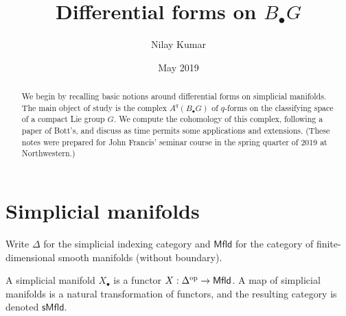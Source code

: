 \documentclass{amsart}
\title{Differential forms on $B_\bullet G$}
\author{Nilay Kumar}
\date{May 2019}
\begin{document}
\begin{abstract}
    We begin by recalling basic notions around differential forms on simplicial
    manifolds. The main object of study is the complex $A^q(B_\bullet G)$ of
    $q$-forms on the classifying space of a compact Lie group $G$. We compute
    the cohomology of this complex, following a paper of Bott's, and discuss as
    time permits some applications and extensions.
    (These notes were prepared for John Francis' seminar course in the spring 
    quarter of 2019 at Northwestern.)
\end{abstract}

\maketitle

\section{Simplicial manifolds}

Write $\Delta$ for the simplicial indexing category and $\mathsf{Mfld}$ for the 
category of finite-dimensional smooth manifolds (without boundary).

\begin{definition}
    A simplicial manifold $X_\bullet$ is a functor $X: \Delta^{\text{op}}\to 
    \mathsf{Mfld}$. A map of simplicial manifolds is a natural transformation of 
    functors, and the resulting category is denoted $\mathsf{sMfld}$.
\end{definition}
\end{document}
